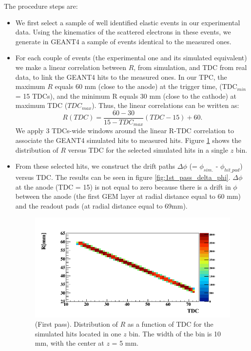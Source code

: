 The procedure steps are:\\
\begin{itemize}
\item We first select a sample of well identified elastic events in our experimental data. Using the
   kinematics of the scattered electrons in these events, we generate in GEANT4
   a sample of events identical to the measured ones. 
\item  For each couple of events (the experimental one and its simulated equivalent)
   we make a linear correlation between $R$, from simulation, and TDC from 
   real data, to link the GEANT4 hits to the measured ones. In our TPC, the 
   maximum $R$ equals 60 mm (close to the anode) at the trigger time, 
   (TDC$_{min}$ = 15 TDCs), and the minimum R equals 30 mm (close to the 
   cathode) at maximum TDC ($TDC_{max}$). Thus, the linear correlations can be 
   written as:
\begin{equation}
   R(TDC) = \frac{60-30}{15-TDC_{max}} (TDC-15) + 60.
\label{equ:R_TDC}
\end{equation}
We apply 3 TDCs-wide windows around the linear R-TDC correlation to associate 
the GEANT4 simulated hits to measured hits. Figure \ref{fig:R_correlation} 
shows the distribution of $R$ versus TDC for the selected simulated hits in a 
single $z$ bin.

\item From these selected hits, we construct the drift paths $\Delta \phi$ (= 
   $\phi_{sim.}$ - $\phi_{hit\_pad}$) versus TDC. The results can be seen in 
   figure \ref{fig:1st_pass_delta_phi}. $\Delta \phi$ at the anode (TDC = 15) 
   is not equal to zero because there is a drift in $\phi$ between the anode 
   (the first GEM layer at radial distance equal to 60 mm) and the readout pads 
   (at radial distance equal to 69mm).

\begin{figure}[tpb]
\centering
\includegraphics[scale=0.45]{fig_rtpc/updates/TdcR_check_p1_10.png}
\caption{(First pass). Distribution of $R$ as a function of TDC for the 
simulated hits located in one $z$ bin. The width of the bin is 10 mm, with the 
center at $z$ = 5 mm.}
\label{fig:R_correlation}
\end{figure}


\end{itemize}
